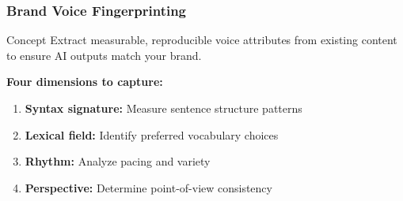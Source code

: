 \documentclass{beamer}
\begin{document}
\begin{frame}
    \frametitle{Brand Voice Fingerprinting}
    \begin{block}{Concept}
        Extract measurable, reproducible voice attributes from existing content to ensure AI outputs match your brand.
    \end{block}
    
    \textbf{Four dimensions to capture:}
    \begin{enumerate}
        \item \textbf{Syntax signature:} Measure sentence structure patterns
        \item \textbf{Lexical field:} Identify preferred vocabulary choices
        \item \textbf{Rhythm:} Analyze pacing and variety
        \item \textbf{Perspective:} Determine point-of-view consistency
    \end{enumerate}
\end{frame}
\end{document}
